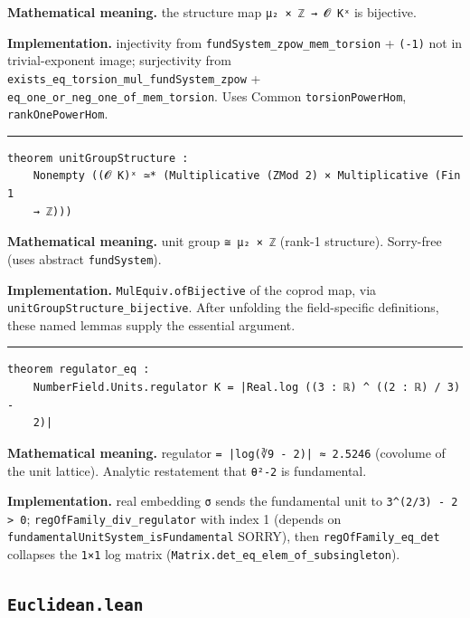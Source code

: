 \documentclass[UTF8,a4paper,11pt,fontset=fandol]{ctexart}
\theoremstyle{definition}
\newcommand{\statementsep}{\par\medskip\hrule\medskip}
\begin{document}
\noindent\textbf{Mathematical meaning.} the structure map \texttt{μ₂ × ℤ → 𝓞 Kˣ} is bijective.\par
\noindent\textbf{Implementation.} injectivity from \texttt{fundSystem\_\allowbreak{}zpow\_\allowbreak{}mem\_\allowbreak{}torsion} + \texttt{(-1)} not in trivial-exponent image; surjectivity from \texttt{exists\_\allowbreak{}eq\_\allowbreak{}torsion\_\allowbreak{}mul\_\allowbreak{}fundSystem\_\allowbreak{}zpow} + \texttt{eq\_\allowbreak{}one\_\allowbreak{}or\_\allowbreak{}neg\_\allowbreak{}one\_\allowbreak{}of\_\allowbreak{}mem\_\allowbreak{}torsion}. Uses Common \texttt{torsionPowerHom}, \texttt{rankOnePowerHom}.\par
\statementsep
\begin{verbatim}
theorem unitGroupStructure :
    Nonempty ((𝓞 K)ˣ ≃* (Multiplicative (ZMod 2) × Multiplicative (Fin 1
    → ℤ)))
\end{verbatim}
\noindent\textbf{Mathematical meaning.} unit group \texttt{≅ μ₂ × ℤ} (rank-1 structure). Sorry-free (uses abstract \texttt{fundSystem}).\par
\noindent\textbf{Implementation.} \texttt{MulEquiv.\allowbreak{}ofBijective} of the coprod map, via \texttt{unitGroupStructure\_\allowbreak{}bijective}. After unfolding the field-specific definitions, these named lemmas supply the essential argument.\par
\statementsep
\begin{verbatim}
theorem regulator_eq :
    NumberField.Units.regulator K = |Real.log ((3 : ℝ) ^ ((2 : ℝ) / 3) -
    2)|
\end{verbatim}
\noindent\textbf{Mathematical meaning.} regulator \texttt{= |log(∛9 - 2)| ≈ 2.\allowbreak{}5246} (covolume of the unit lattice). Analytic restatement that \texttt{θ²-2} is fundamental.\par
\noindent\textbf{Implementation.} real embedding \texttt{σ} sends the fundamental unit to \texttt{3\textasciicircum{}(2/\allowbreak{}3) - 2 > 0}; \texttt{regOfFamily\_\allowbreak{}div\_\allowbreak{}regulator} with index 1 (depends on \texttt{fundamentalUnitSystem\_\allowbreak{}isFundamental} SORRY), then \texttt{regOfFamily\_\allowbreak{}eq\_\allowbreak{}det} collapses the \texttt{1×1} log matrix (\texttt{Matrix.\allowbreak{}det\_\allowbreak{}eq\_\allowbreak{}elem\_\allowbreak{}of\_\allowbreak{}subsingleton}).\par

\subsection{\texttt{Euclidean.lean}}
\end{document}
